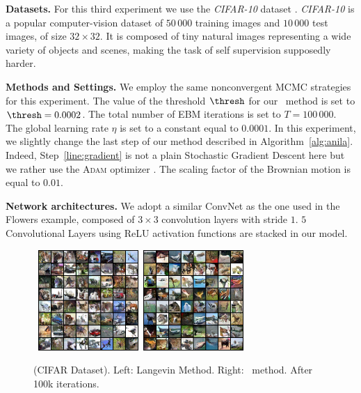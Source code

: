 \documentclass[10pt,twocolumn,letterpaper]{article}
\begin{document}
\textbf{Datasets.}
For this third experiment we use the \textit{CIFAR-10} dataset \cite{krizhevsky2009learning}.
\textit{CIFAR-10}  is a popular computer-vision dataset of $50\,000$ training images and $10\,000$ test images, of size $32\times 32$. 
It is composed of tiny natural images representing a wide variety of objects and scenes, making the task of self supervision supposedly harder.


\medskip
\textbf{Methods and Settings.}
We employ the same nonconvergent MCMC strategies for this experiment.
The value of the threshold $\thresh$ for our \algo\ method is set to $\thresh = 0.0002$.
The total number of EBM iterations is set to $T = 100\,000$.
The global learning rate $\eta$ is set to a constant equal to $0.0001$.
In this experiment, we slightly change the last step of our method described in Algorithm~\ref{alg:anila}.
Indeed, Step~\ref{line:gradient} is not a plain Stochastic Gradient Descent here but we rather use the \textsc{Adam} optimizer \cite{KB15}.
The scaling factor of the Brownian motion is equal to $0.01$.

\medskip
\textbf{Network architectures.} 
We adopt a similar ConvNet as the one used in the Flowers example, composed of $3 \times 3$ convolution layers with stride $1$.
$5$ Convolutional Layers using ReLU activation functions are stacked in our model.



\begin{figure}[t]
\begin{center}
    \mbox{
        \includegraphics[width=1.5in]{figs/cifarlangevin}
        \includegraphics[width=1.5in]{figs/cifaranila}
        }
\end{center}
\caption{(CIFAR Dataset). Left: Langevin Method. Right: \algo\ method. After 100k iterations.}
	\label{fig:cifar}
\end{figure}
\end{document}

